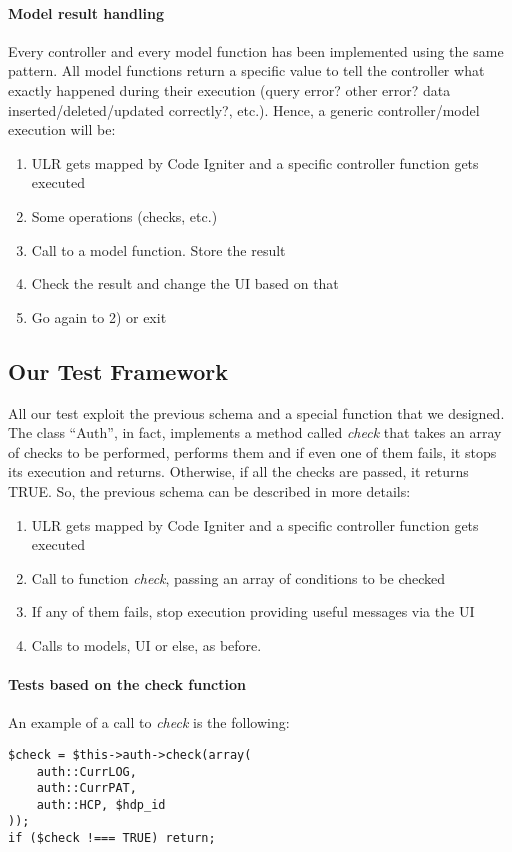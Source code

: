 \paragraph{Model result handling}
Every controller and every model function has been implemented using the same pattern. All model functions return a specific value to tell the controller what exactly happened during their execution (query error? other error? data inserted/deleted/updated correctly?, etc.). Hence, a generic controller/model execution will be:
\begin{enumerate}
\item ULR gets mapped by Code Igniter and a specific controller function gets executed
\item Some operations (checks, etc.)
\item Call to a model function. Store the result
\item Check the result and change the UI based on that
\item Go again to 2) or exit
\end{enumerate}

\subsection{Our Test Framework}
All our test exploit the previous schema and a special function that we designed. The class ``Auth'', in fact, implements a method called \emph{check} that takes an array of checks to be performed, performs them and if even one of them fails, it stops its execution and returns. Otherwise, if all the checks are passed, it returns TRUE. So, the previous schema can be described in more details:
\begin{enumerate}
\item ULR gets mapped by Code Igniter and a specific controller function gets executed
\item Call to function \emph{check}, passing an array of conditions to be checked
\item If any of them fails, stop execution providing useful messages via the UI
\item Calls to models, UI or else, as before.
\end{enumerate}

\paragraph{Tests based on the check function}
An example of a call to \emph{check} is the following:
\begin{verbatim}
$check = $this->auth->check(array(
    auth::CurrLOG,
    auth::CurrPAT,
    auth::HCP, $hdp_id
));
if ($check !=== TRUE) return;
\end{verbatim}

